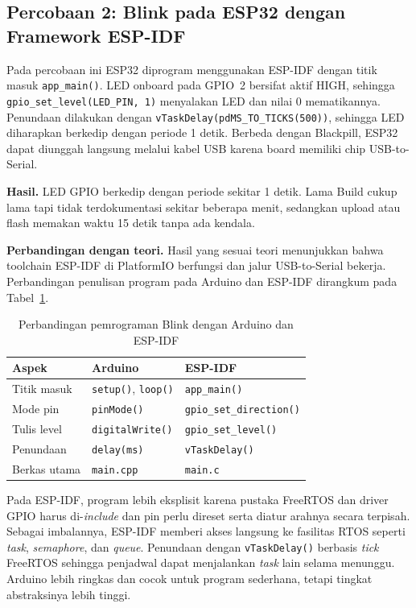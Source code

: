 \subsection{Percobaan 2: Blink pada ESP32 dengan Framework ESP-IDF}

Pada percobaan ini ESP32 diprogram menggunakan ESP-IDF dengan titik masuk \texttt{app\_main()}. LED onboard pada GPIO~2 bersifat aktif HIGH, sehingga \texttt{gpio\_set\_level(LED\_PIN, 1)} menyalakan LED dan nilai 0 mematikannya. Penundaan dilakukan dengan \texttt{vTaskDelay(pdMS\_TO\_TICKS(500))}, sehingga LED diharapkan berkedip dengan periode 1 detik. Berbeda dengan Blackpill, ESP32 dapat diunggah langsung melalui kabel USB karena board memiliki chip USB-to-Serial.

\textbf{Hasil.} LED GPIO berkedip dengan periode sekitar 1 detik. Lama Build cukup lama tapi tidak terdokumentasi sekitar beberapa menit, sedangkan upload atau flash memakan waktu 15 detik tanpa ada kendala.

\textbf{Perbandingan dengan teori.} Hasil yang sesuai teori menunjukkan bahwa toolchain ESP-IDF di PlatformIO berfungsi dan jalur USB-to-Serial bekerja. Perbandingan penulisan program pada Arduino dan ESP-IDF dirangkum pada Tabel~\ref{tab:arduino-idf}.

\begin{table}[H]
  \centering
  \caption{Perbandingan pemrograman Blink dengan Arduino dan ESP-IDF}
  \label{tab:arduino-idf}
  \begin{tabular}{|l|l|l|}
    \hline
    Aspek & Arduino & ESP-IDF \\
    \hline
    Titik masuk & \texttt{setup()}, \texttt{loop()} & \texttt{app\_main()} \\
    Mode pin & \texttt{pinMode()} & \texttt{gpio\_set\_direction()} \\
    Tulis level & \texttt{digitalWrite()} & \texttt{gpio\_set\_level()} \\
    Penundaan & \texttt{delay(ms)} & \texttt{vTaskDelay()} \\
    Berkas utama & \texttt{main.cpp} & \texttt{main.c} \\
    \hline
  \end{tabular}
\end{table}

Pada ESP-IDF, program lebih eksplisit karena pustaka FreeRTOS dan driver GPIO harus di-\textit{include} dan pin perlu direset serta diatur arahnya secara terpisah. Sebagai imbalannya, ESP-IDF memberi akses langsung ke fasilitas RTOS seperti \textit{task}, \textit{semaphore}, dan \textit{queue}. Penundaan dengan \texttt{vTaskDelay()} berbasis \textit{tick} FreeRTOS sehingga penjadwal dapat menjalankan \textit{task} lain selama menunggu. Arduino lebih ringkas dan cocok untuk program sederhana, tetapi tingkat abstraksinya lebih tinggi.

